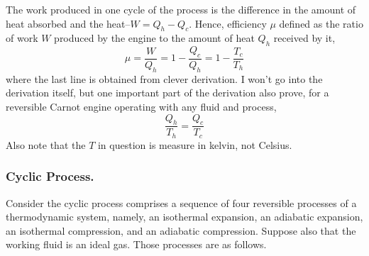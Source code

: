 \documentclass[../../../Main.tex]{subfiles}
\begin{document}
The work produced in one cycle of the process is the difference in the amount of heat absorbed and the heat--$W=Q_h-Q_c$. Hence, efficiency $\mu$ defined as the ratio of work $W$ produced by the engine to the amount of heat $Q_h$ received by it,
\begin{equation*}
    \mu=\frac{W}{Q_h}=1-\frac{Q_c }{Q_h}=1-\frac{T_c}{T_h}
\end{equation*}
where the last line is obtained from clever derivation. I won't go into the derivation itself, but one important part of the derivation also prove, for a reversible Carnot engine operating with any fluid and process, 
\begin{equation*}
    \frac{Q_h}{T_h}=\frac{Q_c}{T_c}
\end{equation*}
Also note that the $T$ in question is measure in kelvin, not Celsius. 

\subsubsection{Cyclic Process.} Consider the cyclic process comprises a sequence of four reversible processes of a thermodynamic system, namely, an isothermal expansion, an adiabatic expansion, an isothermal compression, and an adiabatic compression. Suppose also that the working fluid is an ideal gas. Those processes are as follows.
\end{document}
